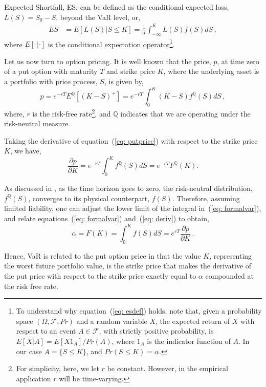 \documentclass[11pt,a4paper,english]{article}
\begin{document}
Expected Shortfall, ES, can be defined \citep{Embrechts1997} as the conditional expected loss, $L(S)=S_0-S$, beyond the VaR level, or,
\begin{align}
\label{eq: esdef}
ES &= E[L(S)|S \leq K] =\frac{1}{\alpha}\int_{-\infty}^{K}L(S)f(S)dS \, ,
\end{align} 
where $E[\cdot|\cdot]$ is the conditional expectation operator\footnote{To understand why equation~(\ref{eq: esdef}) holds, note that, given a probability space $(\Omega, \mathcal{F}, Pr)$ and a random variable $X$, the expected return of $X$ with respect to an event $A\in \mathcal{F}$, with strictly positive probability, is $E[X|A]=E[X1_{A}]/Pr(A)$, where $1_{A}$ is the indicator function of $A$. In our case $A=\{S\leq K\}$, and $Pr(S \leq K)=\alpha$.}.

Let us now turn to option pricing. It is well known that the price, $p$, at time zero of a put option with maturity $T$ and strike price $K$, where the underlying asset is a portfolio with price process, $S$, is given by,
\begin{equation}
\label{eq: putprice}
p = e^{-rT}E^{\mathbb{Q}}[(K-S)^{+}]=e^{-rT}\int_{0}^{K}(K-S)f^{\mathbb{Q}}(S)dS \, ,
\end{equation}
where, $r$ is the risk-free rate\footnote{For simplicity, here, we let $r$ be constant. However, in the empirical application $r$ will be time-varying.}, and $\mathbb{Q}$ indicates that we are operating under the risk-neutral measure. 

Taking the derivative of equation~(\ref{eq: putprice}) with respect to the strike price $K$, we have,
\begin{equation}
\label{eq: deriv}
\frac{\partial p}{\partial K}= e^{-rT}\int_{0}^{K}f^{\mathbb{Q}}(S)dS = e^{-rT}F^{\mathbb{Q}}(K).
\end{equation}

As discussed in \citet{GBA16}, as the time horizon goes to zero, the risk-neutral distribution, $f^{\mathbb{Q}}(S)$, converges to its physical counterpart, $f(S)$. Therefore, assuming limited liability, one can adjust the lower limit of the integral in~(\ref{eq: formalvar}), and relate equations~(\ref{eq: formalvar}) and~(\ref{eq: deriv}) to obtain,
\begin{equation}
\label{eq: link}
\alpha =F(K)=\int_{0}^{K}f(S)dS=e^{rT}\frac{\partial p}{\partial K} \, .
\end{equation}

Hence, VaR is related to the put option price in that the value $K$, representing the worst future portfolio value, is the strike price that makes the derivative of the put price with respect to the strike price exactly equal to $\alpha$ compounded at the risk free rate.
\end{document}
